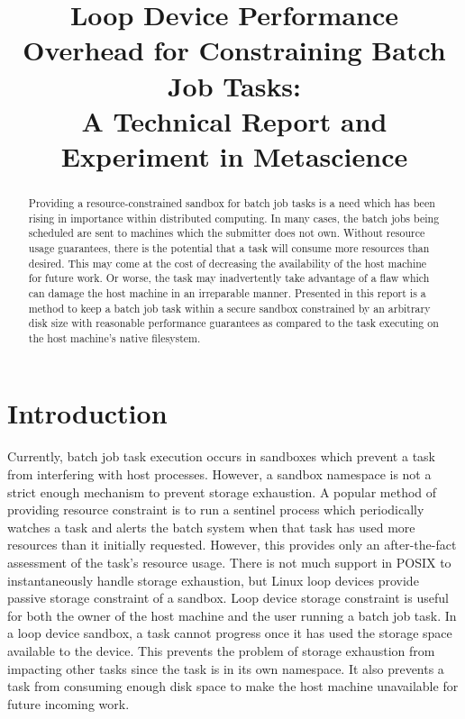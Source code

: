 \documentclass[conference]{IEEEtran}
\begin{document}
\title{Loop Device Performance Overhead for Constraining Batch Job Tasks:\\A Technical Report and Experiment in Metascience}


\author{
}


\maketitle


\begin{abstract}
Providing a resource-constrained sandbox for batch job tasks is a need which has been rising in importance within distributed computing. In many cases, the batch jobs being scheduled are sent to machines which the submitter does not own. Without resource usage guarantees, there is the potential that a task will consume more resources than desired. This may come at the cost of decreasing the availability of the host machine for future work. Or worse, the task may inadvertently take advantage of a flaw which can damage the host machine in an irreparable manner. Presented in this report is a method to keep a batch job task within a secure sandbox constrained by an arbitrary disk size with reasonable performance guarantees as compared to the task executing on the host machine's native filesystem.
\end{abstract}

\IEEEpeerreviewmaketitle



\section{Introduction}
Currently, batch job task execution occurs in sandboxes which prevent a task from interfering with host processes. However, a sandbox namespace is not a strict enough mechanism to prevent storage exhaustion. A popular method of providing resource constraint is to run a sentinel process which periodically watches a task and alerts the batch system when that task has used more resources than it initially requested. However, this provides only an after-the-fact assessment of the task's resource usage. There is not much support in POSIX to instantaneously handle storage exhaustion, but Linux loop devices provide passive storage constraint of a sandbox. Loop device storage constraint is useful for both the owner of the host machine and the user running a batch job task. In a loop device sandbox, a task cannot progress once it has used the storage space available to the device. This prevents the problem of storage exhaustion from impacting other tasks since the task is in its own namespace. It also prevents a task from consuming enough disk space to make the host machine unavailable for future incoming work.
\end{document}
